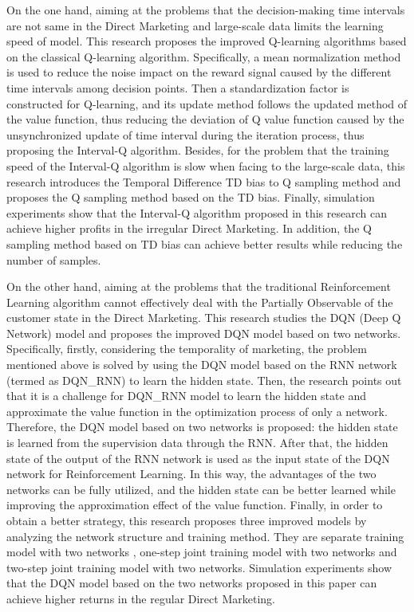 \begin{enabstract}
On the one hand, aiming at the problems that the decision-making time intervals are not same in the Direct Marketing and large-scale data limits the learning speed of model. This research proposes the improved Q-learning algorithms based on the classical Q-learning algorithm. Specifically, a mean normalization method is used to reduce the noise impact on the reward signal caused by the different time intervals among decision points. Then a standardization factor is constructed for Q-learning, and its update method follows the updated method of the value function, thus reducing the deviation of Q value function caused by the unsynchronized update of time interval during the iteration process, thus proposing the Interval-Q algorithm. Besides, for the problem that the training speed of the Interval-Q algorithm is slow when facing to the large-scale data, this research introduces the Temporal Difference TD bias to Q sampling method and proposes the Q sampling method based on the TD bias. Finally, simulation experiments show that the Interval-Q algorithm proposed in this research can achieve higher profits in the irregular Direct Marketing. In addition, the Q sampling method based on TD bias can achieve better results while reducing the number of samples.

On the other hand, aiming at the problems that the traditional Reinforcement Learning algorithm cannot effectively deal with the Partially Observable of the customer state in the Direct Marketing. This research studies the DQN (Deep Q Network) model and proposes the improved DQN model based on two networks. Specifically, firstly, considering the temporality of marketing, the problem mentioned above is solved by using the DQN model based on the RNN network (termed as DQN_RNN) to learn the hidden state. Then, the research points out that it is a challenge for DQN_RNN model to learn the hidden state and approximate the value function in the optimization process of only a network. Therefore, the DQN model based on two networks is proposed: the hidden state is learned from the supervision data through the RNN. After that, the hidden state of the output of the RNN network is used as the input state of the DQN network for Reinforcement Learning. In this way, the advantages of the two networks can be fully utilized, and the hidden state can be better learned while improving the approximation effect of the value function. Finally, in order to obtain a better strategy, this research proposes three improved models by analyzing the network structure and training method. They are separate training model with two networks , one-step joint training model with two networks and two-step joint training model with two networks. Simulation experiments show that the DQN model based on the two networks proposed in this paper can achieve higher returns in the regular Direct Marketing.


\end{enabstract}